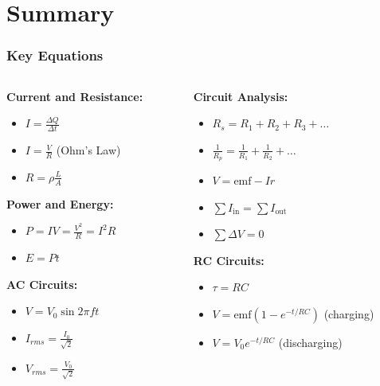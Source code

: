 \documentclass{beamer}
\begin{document}
\section{Summary}
\begin{frame}
    \frametitle{Key Equations}
    \begin{columns}
        \begin{column}{0.5\textwidth}
            \textbf{Current and Resistance:}
            \begin{itemize}
                \item $I = \frac{\Delta Q}{\Delta t}$
                \item $I = \frac{V}{R}$ (Ohm's Law)
                \item $R = \rho\frac{L}{A}$
            \end{itemize}
            
            \textbf{Power and Energy:}
            \begin{itemize}
                \item $P = IV = \frac{V^2}{R} = I^2R$
                \item $E = Pt$
            \end{itemize}
            
            \textbf{AC Circuits:}
            \begin{itemize}
                \item $V = V_0 \sin 2\pi ft$
                \item $I_{rms} = \frac{I_0}{\sqrt{2}}$
                \item $V_{rms} = \frac{V_0}{\sqrt{2}}$
            \end{itemize}
        \end{column}
        \begin{column}{0.5\textwidth}
            \textbf{Circuit Analysis:}
            \begin{itemize}
                \item $R_s = R_1 + R_2 + R_3 + \ldots$
                \item $\frac{1}{R_p} = \frac{1}{R_1} + \frac{1}{R_2} + \ldots$
                \item $V = \text{emf} - Ir$
                \item $\sum I_{\text{in}} = \sum I_{\text{out}}$
                \item $\sum \Delta V = 0$
            \end{itemize}
            
            \textbf{RC Circuits:}
            \begin{itemize}
                \item $\tau = RC$
                \item $V = \text{emf}(1-e^{-t/RC})$ (charging)
                \item $V = V_0e^{-t/RC}$ (discharging)
            \end{itemize}
            

\end{column}
\end{columns}
\end{frame}
\end{document}

